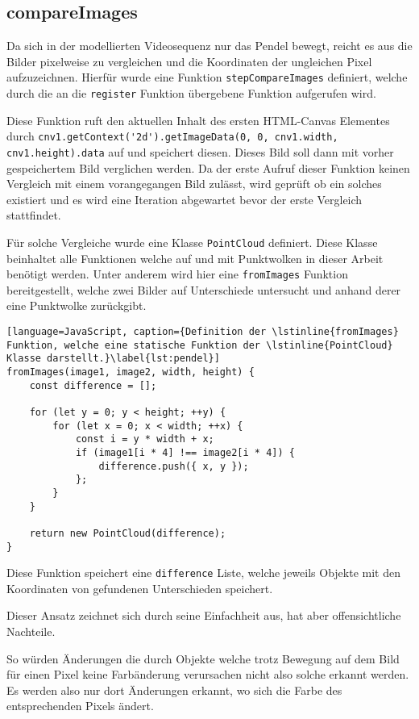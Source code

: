 \subsection{compareImages}

Da sich in der modellierten Videosequenz nur das Pendel bewegt, reicht es aus die Bilder pixelweise zu vergleichen und die Koordinaten der ungleichen Pixel aufzuzeichnen.
Hierfür wurde eine Funktion \lstinline{stepCompareImages} definiert, welche durch die an die \lstinline{register} Funktion übergebene Funktion aufgerufen wird.

Diese Funktion ruft den aktuellen Inhalt des ersten HTML-Canvas Elementes durch \lstinline{cnv1.getContext('2d').getImageData(0, 0, cnv1.width, cnv1.height).data} auf und speichert diesen.
Dieses Bild soll dann mit vorher gespeichertem Bild verglichen werden.
Da der erste Aufruf dieser Funktion keinen Vergleich mit einem vorangegangen Bild zulässt, wird geprüft ob ein solches existiert und es wird eine Iteration abgewartet bevor der erste Vergleich stattfindet.

Für solche Vergleiche wurde eine Klasse \lstinline{PointCloud} definiert.
Diese Klasse beinhaltet alle Funktionen welche auf und mit Punktwolken in dieser Arbeit benötigt werden.
Unter anderem wird hier eine \lstinline{fromImages} Funktion bereitgestellt, welche zwei Bilder auf Unterschiede untersucht und anhand derer eine Punktwolke zurückgibt.

\begin{lstlisting}[language=JavaScript, caption={Definition der \lstinline{fromImages} Funktion, welche eine statische Funktion der \lstinline{PointCloud} Klasse darstellt.}\label{lst:pendel}]
fromImages(image1, image2, width, height) {
    const difference = [];

    for (let y = 0; y < height; ++y) {
        for (let x = 0; x < width; ++x) {
            const i = y * width + x;
            if (image1[i * 4] !== image2[i * 4]) {
                difference.push({ x, y });
            };
        }
    }

    return new PointCloud(difference);
}
\end{lstlisting}

Diese Funktion speichert eine \lstinline{difference} Liste, welche jeweils Objekte mit den Koordinaten von gefundenen Unterschieden speichert.

Dieser Ansatz zeichnet sich durch seine Einfachheit aus, hat aber offensichtliche Nachteile.

So würden Änderungen die durch Objekte welche trotz Bewegung auf dem Bild für einen Pixel keine Farbänderung verursachen nicht also solche erkannt werden.
Es werden also nur dort Änderungen erkannt, wo sich die Farbe des entsprechenden Pixels ändert.

